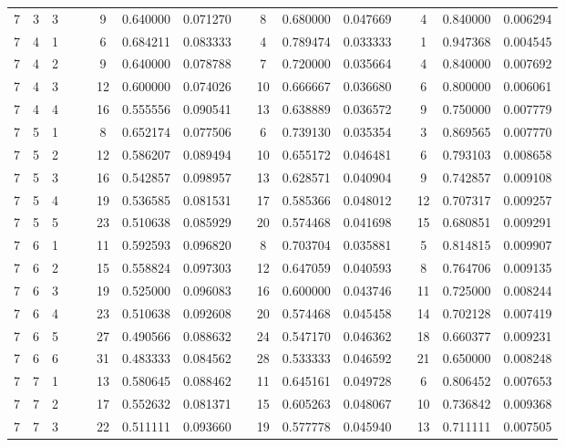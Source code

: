 \begin{appendix}
\begin{longtable}[h]{rrrccccccccccccc}
7	&	3	&	3	&&&	9	&	0.640000	&	0.071270	&&	8	&	0.680000	&	0.047669	&&	4	&	0.840000	&	0.006294	\\
7	&	4	&	1	&&&	6	&	0.684211	&	0.083333	&&	4	&	0.789474	&	0.033333	&&	1	&	0.947368	&	0.004545	\\
7	&	4	&	2	&&&	9	&	0.640000	&	0.078788	&&	7	&	0.720000	&	0.035664	&&	4	&	0.840000	&	0.007692	\\
7	&	4	&	3	&&&	12	&	0.600000	&	0.074026	&&	10	&	0.666667	&	0.036680	&&	6	&	0.800000	&	0.006061	\\
7	&	4	&	4	&&&	16	&	0.555556	&	0.090541	&&	13	&	0.638889	&	0.036572	&&	9	&	0.750000	&	0.007779	\\
7	&	5	&	1	&&&	8	&	0.652174	&	0.077506	&&	6	&	0.739130	&	0.035354	&&	3	&	0.869565	&	0.007770	\\
7	&	5	&	2	&&&	12	&	0.586207	&	0.089494	&&	10	&	0.655172	&	0.046481	&&	6	&	0.793103	&	0.008658	\\
7	&	5	&	3	&&&	16	&	0.542857	&	0.098957	&&	13	&	0.628571	&	0.040904	&&	9	&	0.742857	&	0.009108	\\
7	&	5	&	4	&&&	19	&	0.536585	&	0.081531	&&	17	&	0.585366	&	0.048012	&&	12	&	0.707317	&	0.009257	\\
7	&	5	&	5	&&&	23	&	0.510638	&	0.085929	&&	20	&	0.574468	&	0.041698	&&	15	&	0.680851	&	0.009291	\\
7	&	6	&	1	&&&	11	&	0.592593	&	0.096820	&&	8	&	0.703704	&	0.035881	&&	5	&	0.814815	&	0.009907	\\
7	&	6	&	2	&&&	15	&	0.558824	&	0.097303	&&	12	&	0.647059	&	0.040593	&&	8	&	0.764706	&	0.009135	\\
7	&	6	&	3	&&&	19	&	0.525000	&	0.096083	&&	16	&	0.600000	&	0.043746	&&	11	&	0.725000	&	0.008244	\\
7	&	6	&	4	&&&	23	&	0.510638	&	0.092608	&&	20	&	0.574468	&	0.045458	&&	14	&	0.702128	&	0.007419	\\
7	&	6	&	5	&&&	27	&	0.490566	&	0.088632	&&	24	&	0.547170	&	0.046362	&&	18	&	0.660377	&	0.009231	\\
7	&	6	&	6	&&&	31	&	0.483333	&	0.084562	&&	28	&	0.533333	&	0.046592	&&	21	&	0.650000	&	0.008248	\\
7	&	7	&	1	&&&	13	&	0.580645	&	0.088462	&&	11	&	0.645161	&	0.049728	&&	6	&	0.806452	&	0.007653	\\
7	&	7	&	2	&&&	17	&	0.552632	&	0.081371	&&	15	&	0.605263	&	0.048067	&&	10	&	0.736842	&	0.009368	\\
7	&	7	&	3	&&&	22	&	0.511111	&	0.093660	&&	19	&	0.577778	&	0.045940	&&	13	&	0.711111	&	0.007505	\\

\end{longtable}
\end{appendix}
